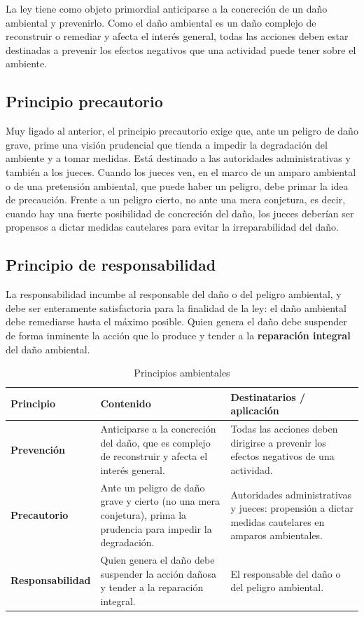 \documentclass[12pt,oneside]{book}
\begin{document}
La ley tiene como objeto primordial anticiparse a la concreción de un daño ambiental y prevenirlo. Como el daño ambiental es un daño complejo de reconstruir o remediar y afecta el interés general, todas las acciones deben estar destinadas a prevenir los efectos negativos que una actividad puede tener sobre el ambiente.

\subsection{Principio precautorio}

Muy ligado al anterior, el principio precautorio exige que, ante un peligro de daño grave, prime una visión prudencial que tienda a impedir la degradación del ambiente y a tomar medidas. Está destinado a las autoridades administrativas y también a los jueces. Cuando los jueces ven, en el marco de un amparo ambiental o de una pretensión ambiental, que puede haber un peligro, debe primar la idea de precaución. Frente a un peligro cierto, no ante una mera conjetura, es decir, cuando hay una fuerte posibilidad de concreción del daño, los jueces deberían ser propensos a dictar medidas cautelares para evitar la irreparabilidad del daño.

\subsection{Principio de responsabilidad}

La responsabilidad incumbe al responsable del daño o del peligro ambiental, y debe ser enteramente satisfactoria para la finalidad de la ley: el daño ambiental debe remediarse hasta el máximo posible. Quien genera el daño debe suspender de forma inminente la acción que lo produce y tender a la \textbf{reparación integral} del daño ambiental.

\begin{table}[H]
\centering
\small
\caption{Principios ambientales}
\begin{tabularx}{\textwidth}{>{\raggedright\arraybackslash\bfseries}p{2.6cm} >{\raggedright\arraybackslash}X >{\raggedright\arraybackslash}X}
\toprule
Principio & Contenido & Destinatarios / aplicación \\
\midrule
Prevención & Anticiparse a la concreción del daño, que es complejo de reconstruir y afecta el interés general. & Todas las acciones deben dirigirse a prevenir los efectos negativos de una actividad. \\
Precautorio & Ante un peligro de daño grave y cierto (no una mera conjetura), prima la prudencia para impedir la degradación. & Autoridades administrativas y jueces: propensión a dictar medidas cautelares en amparos ambientales. \\
Responsabilidad & Quien genera el daño debe suspender la acción dañosa y tender a la reparación integral. & El responsable del daño o del peligro ambiental. \\
\bottomrule
\end{tabularx}
\end{table}
\end{document}
